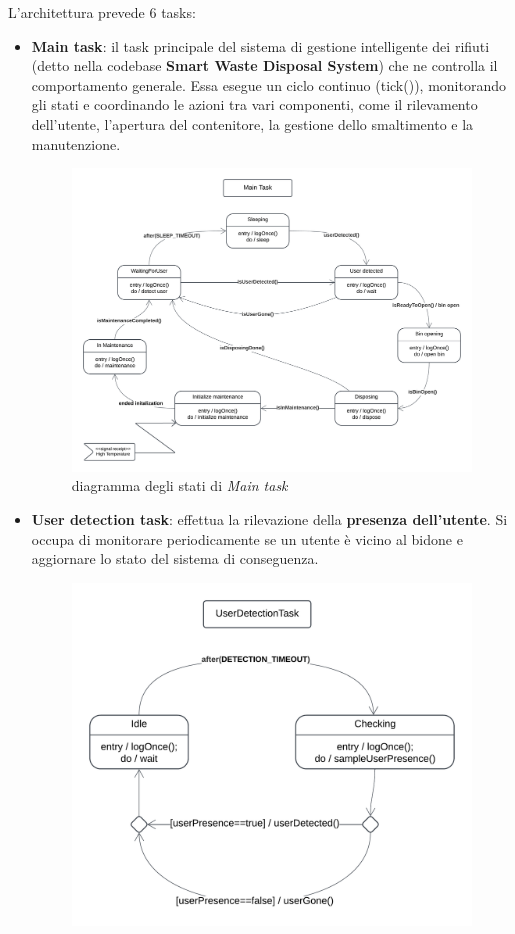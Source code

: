 \documentclass{report}
\begin{document}
\par{
L'architettura prevede 6 tasks: 
}
\begin{itemize}
    \item {
    \textbf{Main task}: il task principale del sistema di gestione intelligente dei rifiuti (detto nella codebase \textbf{Smart Waste Disposal System}) che ne controlla il comportamento generale. Essa esegue un ciclo continuo (tick()), monitorando gli stati e coordinando le azioni tra vari componenti, come il rilevamento dell'utente, l'apertura del contenitore, la gestione dello smaltimento e la manutenzione.
    \begin{figure}[H]
        \centering
        \includegraphics[width=\linewidth]{img/assignment-02/Diagrammi per IOT - MainTask.png}
        \caption{diagramma degli stati di \textit{Main task}}
        \label{fig:main-task}
    \end{figure}
    }
    \item {
    \textbf{User detection task}: effettua la rilevazione della \textbf{presenza dell'utente}. Si occupa di monitorare periodicamente se un utente è vicino al bidone e aggiornare lo stato del sistema di conseguenza.
    \begin{figure}[H]
        \centering
        \includegraphics[width=0.7\linewidth]{img/assignment-02/Diagrammi per IOT - User DetectionTask.png}

\end{figure}}
\end{itemize}
\end{document}
